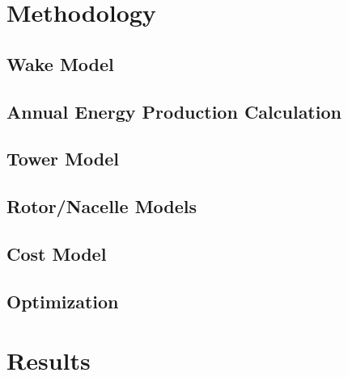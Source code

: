 \documentclass[wes, manuscript]{copernicus}
\begin{document}
\section{Methodology}

	\subsection{Wake Model}
	
      
	\subsection{Annual Energy Production Calculation}
	

	\subsection{Tower Model}
	

	\subsection{Rotor/Nacelle Models}
	

	\subsection{Cost Model}
	

	\subsection{Optimization}
	\label{sec:optimization}
	




\section{Results}



\conclusions 





\end{document}
